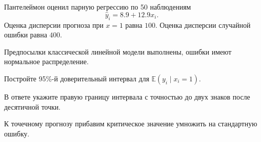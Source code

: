 
\begin{question}
Пантелеймон оценил парную регрессию по 50 наблюдениям
\[
\hat y_i = 8.9 + 12.9 x_i.
\]
Оценка дисперсии прогноза при \(x=1\) равна \(100\).
Оценка дисперсии случайной ошибки равна \(400\).

Предпосылки классической линейной модели выполнены, ошибки имеют нормальное распределение.

Постройте 95\%-й доверительный интервал для \(\mathbb{E}(y_i \mid x_i = 1)\).

В ответе укажите правую границу интервала с точностью до двух знаков после десятичной точки.
\end{question}

\begin{solution}
К точечному прогнозу прибавим критическое значение умножить на стандартную ошибку.
\end{solution}

